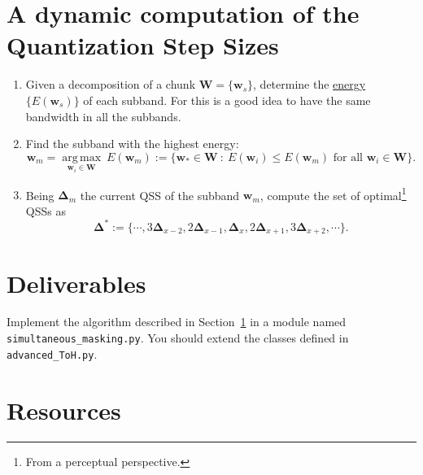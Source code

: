 \section{A dynamic computation of the Quantization Step Sizes}
\label{sec:algo}
\begin{enumerate}
\item Given a decomposition of a chunk
  ${\mathbf W}=\{{\mathbf w}_s\}$, determine the
  \href{https://en.wikipedia.org/wiki/Energy_(signal_processing)}{energy}
  $\{E({\mathbf w}_s)\}$ of each subband. For this is a good idea to
  have the same bandwidth in all the subbands.
\item Find the subband with the highest energy:
  \begin{equation}
    {\mathbf w}_m = \underset{{\mathbf w}_i \in {\mathbf W}}{\operatorname{arg\,max}}~E({\mathbf w}_m) := \{{\mathbf w}_* \in {\mathbf W} ~:~ E({\mathbf w}_i) \leq E({\mathbf w}_m) \text{ for all } {\mathbf w}_i \in {\mathbf W} \}.
  \end{equation}
\item Being ${\mathbf \Delta}_m$ the current QSS of the subband
  ${\mathbf w}_m$, compute the set of optimal\footnote{From a
    perceptual perspective.} QSSs as
  \begin{equation}
    {\mathbf \Delta}^* := \{\cdots,3{\mathbf \Delta}_{x-2},2{\mathbf \Delta}_{x-1},{\mathbf \Delta}_x,2{\mathbf \Delta}_{x+1},3{\mathbf \Delta}_{x+2}, \cdots\}.
  \end{equation}
\end{enumerate}

\section{Deliverables}

Implement the algorithm described in Section~\ref{sec:algo} in a
module named \verb|simultaneous_masking.py|. You should extend the
classes defined in \verb|advanced_ToH.py|.

\section{Resources}



